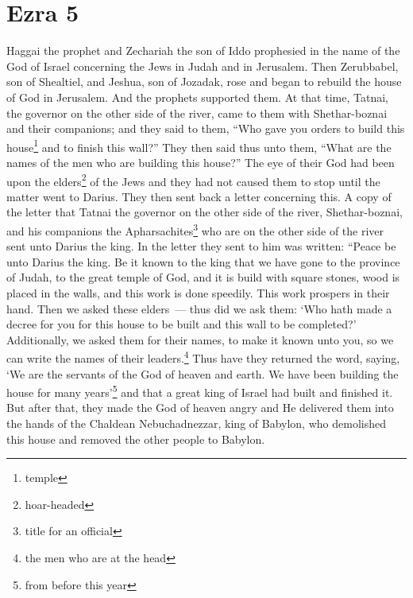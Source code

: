 \section{Ezra 5}\label{Ezra 5}
\begin{enumerate}[align=center]
     Haggai the prophet and Zechariah the son of Iddo prophesied in the name of the God of Israel concerning the Jews in Judah and in Jerusalem.%
     Then Zerubbabel, son of Shealtiel, and Jeshua, son of Jozadak, rose and began to rebuild the house of God in Jerusalem. And the prophets supported them.%
     At that time, Tatnai, the governor on the other side of the river, came to them with Shethar-boznai and their companions; and they said to them, ``Who gave you orders to build this house\footnote{temple} and to finish this wall?''%
     They then said thus unto them, ``What are the names of the men who are building this house?''%
     The eye of their God had been upon the elders\footnote{hoar-headed} of the Jews and they had not caused them to stop until the matter went to Darius. They then sent back a letter concerning this.%
     A copy of the letter that Tatnai the governor on the other side of the river, Shethar-boznai, and his companions the Apharsachites\footnote{title for an official} who are on the other side of the river sent unto Darius the king.%
     In the letter they sent to him was written: ``Peace be unto Darius the king.%
     Be it known to the king that we have gone to the province of Judah, to the great temple of God, and it is build with square stones, wood is placed in the walls, and this work is done speedily. This work prospers in their hand.%
     Then we asked these elders~--- thus did we ask them: `Who hath made a decree for you for this house to be built and this wall to be completed?'%
     Additionally, we asked them for their names, to make it known unto you, so we can write the names of their leaders.\footnote{the men who are at the head}%
     Thus have they returned the word, saying, `We are the servants of the God of heaven and earth. We have been building the house for many years'\footnote{from before this year} and that a great king of Israel had built and finished it.%
     But after that, they made the God of heaven angry and He delivered them into the hands of the Chaldean Nebuchadnezzar, king of Babylon, who demolished this house and removed the other people to Babylon.%

\end{enumerate}
